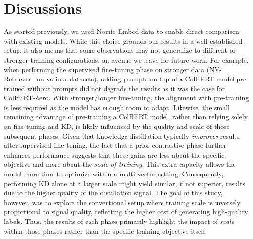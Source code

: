 \section{Discussions}

\label{2602:sec:discussions}
As started previously, we used Nomic Embed data to enable direct comparison with existing models. While this choice grounds our results in a well-established setup, it also means that some observations may not generalize to different or stronger training configurations, an avenue we leave for future work.
For example, when performing the supervised fine-tuning phase on stronger data (NV-Retriever~\cite{moreira2024nv} on various datasets), adding prompts on top of a ColBERT model pre-trained without prompts did not degrade the results as it was the case for ColBERT-Zero. With stronger/longer fine-tuning, the alignment with pre-training is less required as the model has enough room to adapt. Likewise, the small remaining advantage of pre-training a ColBERT model, rather than relying solely on fine-tuning and KD, is likely influenced by the quality and scale of those subsequent phases. Given that knowledge distillation typically \emph{improves} results after supervised fine-tuning, the fact that a prior contrastive phase further enhances performance suggests that these gains are less about the specific objective and more about the \emph{scale of training}. This extra capacity allows the model more time to optimize within a multi-vector setting. Consequently, performing KD alone at a larger scale might yield similar, if not superior, results due to the higher quality of the distillation signal. The goal of this study, however, was to explore the conventional setup where training scale is inversely proportional to signal quality, reflecting the higher cost of generating high-quality labels. Thus, the results of each phase primarily highlight the impact of \emph{scale} within those phases rather than the specific training objective itself.




